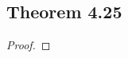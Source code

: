 \documentclass[../../main.tex]{subfiles}
\begin{document}
\subsection{Theorem 4.25}
\begin{wts}

\end{wts}
\begin{proof}

\end{proof}
\end{document}
